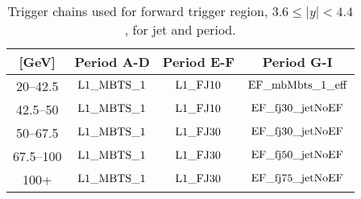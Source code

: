 \begin{table}[htdp]
\centering
\begin{tabular}{ | c | c | c | c | }
  \hline
 \pt{} [GeV] & Period A-D & Period E-F & Period G-I \\
  \hline
\rm 20--42.5 &       $\rm L1\_ MBTS\_ 1$ & $\rm L1\_ FJ10$ & $\rm EF\_ mbMbts\_ 1\_ eff$  \\
\rm 42.5--50 &       $\rm L1\_ MBTS\_ 1$ & $\rm L1\_ FJ10$ & $\rm EF\_ fj30\_ jetNoEF$  \\
\rm 50--67.5 &       $\rm L1\_ MBTS\_ 1$ & $\rm L1\_ FJ30$ & $\rm EF\_ fj30\_ jetNoEF$  \\
\rm 67.5--100 &      $\rm L1\_ MBTS\_ 1$ & $\rm L1\_ FJ30$ & $\rm EF\_ fj50\_ jetNoEF$  \\
\rm 100+ &           $\rm L1\_ MBTS\_ 1$ & $\rm L1\_ FJ30$ & $\rm EF\_ fj75\_ jetNoEF$  \\

  \hline
\end{tabular}
\caption[Triggers used for jets in the forward region]{
Trigger chains used for forward trigger region, $3.6\le|y|<4.4$, for jet \pt{} and period.
\label{tab:ForwardTrigger}}
\end{table}%

